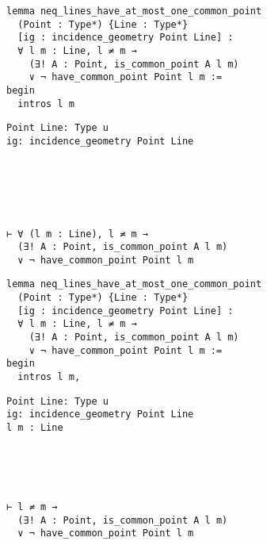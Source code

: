 \begin{frame}[fragile]
	\begin{multicols}{2}
		\begin{lstlisting}
lemma neq_lines_have_at_most_one_common_point 
  (Point : Type*) {Line : Type*} 
  [ig : incidence_geometry Point Line] :
  ∀ l m : Line, l ≠ m → 
    (∃! A : Point, is_common_point A l m) 
    ∨ ¬ have_common_point Point l m := 
begin
  intros l m
\end{lstlisting}
		\columnbreak
		\begin{lstlisting}
Point Line: Type u
ig: incidence_geometry Point Line






⊢ ∀ (l m : Line), l ≠ m → 
  (∃! A : Point, is_common_point A l m) 
  ∨ ¬ have_common_point Point l m
		\end{lstlisting}
	\end{multicols}
\end{frame}










\begin{frame}[fragile]
	\begin{multicols}{2}
		\begin{lstlisting}
lemma neq_lines_have_at_most_one_common_point 
  (Point : Type*) {Line : Type*} 
  [ig : incidence_geometry Point Line] :
  ∀ l m : Line, l ≠ m → 
    (∃! A : Point, is_common_point A l m) 
    ∨ ¬ have_common_point Point l m := 
begin
  intros l m,
\end{lstlisting}
		\columnbreak
		\begin{lstlisting}
Point Line: Type u
ig: incidence_geometry Point Line
l m : Line





⊢ l ≠ m → 
  (∃! A : Point, is_common_point A l m) 
  ∨ ¬ have_common_point Point l m
		\end{lstlisting}
	\end{multicols}
\end{frame}










